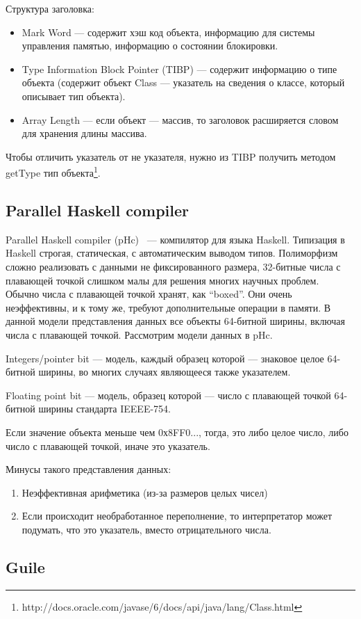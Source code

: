 Структура заголовка:
\begin{itemize}
\item Mark Word — содержит хэш код объекта, информацию для системы управления памятью, информацию о состоянии блокировки. 
\item Type Information Block Pointer (TIBP) — содержит информацию о типе объекта (содержит объект Class — указатель на сведения о классе, который описывает тип объекта).
\item Array Length — если объект — массив, то заголовок расширяется словом для хранения длины массива.
\end{itemize}            
Чтобы отличить указатель от не указателя, нужно из TIBP получить методом getType тип объекта\footnote{http://docs.oracle.com/javase/6/docs/api/java/lang/Class.html}.

\subsection {Parallel Haskell compiler}
Parallel Haskell compiler (pHc)~\cite{pHc} — компилятор для языка Haskell.
Типизация в Haskell строгая, статическая, с автоматическим выводом типов.
Полиморфизм сложно реализовать с данными не фиксированного размера, 32-битные
числа с плавающей точкой слишком малы для решения многих научных проблем. Обычно
числа с плавающей точкой хранят, как ``boxed''. 
Они очень неэффективны, и к тому же, требуют дополнительные операции в памяти.
В данной модели представления данных все объекты 64-битной ширины, включая числа с плавающей точкой.
Рассмотрим модели данных в pHc.

Integers/pointer bit — модель, каждый образец которой --- знаковое целое 64-битной ширины, 
во многих случаях являющееся также указателем.

Floating point bit — модель, образец которой --- число с плавающей точкой 64-битной ширины стандарта IEEEE-754.

Если значение объекта
меньше чем 0х8FF0...,
тогда, это либо целое число, либо число с плавающей точкой,
иначе это указатель.

Минусы такого представления данных: 
\begin{enumerate}
\item Неэффективная арифметика (из-за размеров целых чисел)
\item Если происходит необработанное переполнение, то интерпретатор может 
подумать, что это указатель, вместо отрицательного числа.
\end{enumerate}
\subsection {Guile}

